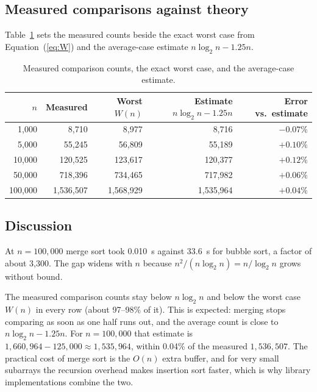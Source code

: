\documentclass[11pt,a4paper]{article}
\theoremstyle{plain}
\theoremstyle{definition}
\renewcommand{\lg}{\log_2}
\begin{document}
\subsection{Measured comparisons against theory}
Table~\ref{tab:thy} sets the measured counts beside the exact worst case from Equation~(\ref{eq:W}) and the average-case estimate $n\lg n-1.25n$.
\begin{table}[!ht]
\centering\small
\begin{tabular}{@{}rrrrr@{}}
\toprule
$n$ & Measured & Worst $W(n)$ & Estimate $n\lg n-1.25n$ & Error vs.\ estimate\\
\midrule
1,000 & 8,710 & 8,977 & 8,716 & $-0.07\%$\\
5,000 & 55,245 & 56,809 & 55,189 & $+0.10\%$\\
10,000 & 120,525 & 123,617 & 120,377 & $+0.12\%$\\
50,000 & 718,396 & 734,465 & 717,982 & $+0.06\%$\\
100,000 & 1,536,507 & 1,568,929 & 1,535,964 & $+0.04\%$\\
\bottomrule
\end{tabular}
\caption{Measured comparison counts, the exact worst case, and the average-case estimate.}
\label{tab:thy}
\end{table}

\subsection{Discussion}
At $n=100{,}000$ merge sort took 0.010~s against 33.6~s for bubble sort, a factor of about 3,300. The gap widens with $n$ because $n^2/(n\lg n)=n/\lg n$ grows without bound.

The measured comparison counts stay below $n\lg n$ and below the worst case $W(n)$ in every row (about 97--98\% of it). This is expected: merging stops comparing as soon as one half runs out, and the average count is close to $n\lg n-1.25n$. For $n=100{,}000$ that estimate is $1{,}660{,}964-125{,}000\approx1{,}535{,}964$, within 0.04\% of the measured $1{,}536{,}507$. The practical cost of merge sort is the $O(n)$ extra buffer, and for very small subarrays the recursion overhead makes insertion sort faster, which is why library implementations combine the two.

\end{document}
